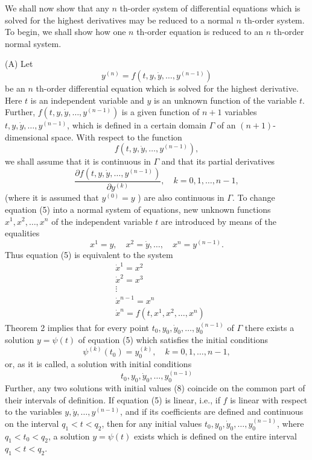 \documentclass[10pt,a5paper]{book}
\theoremstyle{plain}
\theoremstyle{definition}
\theoremstyle{remark}
\begin{document}
We shall now show that any $n$ th-order system of differential equations which is solved for the highest derivatives may be reduced to a normal $n$ th-order system. To begin, we shall show how one $n$ th-order equation is reduced to an $n$ th-order normal system.

(A) Let
\begin{equation*}
y^{(n)}=f\left(t, y, \dot{y}, \ldots, y^{(n-1)}\right) \tag{5}
\end{equation*}
be an $n$ th-order differential equation which is solved for the highest derivative. Here $t$ is an independent variable and $y$ is an unknown function of the variable $t$. Further, $f\left(t, y, \dot{y}, \ldots, y^{(n-1)}\right)$ is a given function of $n+1$ variables $t, y, \dot{y}, \ldots, y^{(n-1)}$, which is defined in a certain domain $\Gamma$ of an $(n+1)$-dimensional space. With respect to the function
\[
f\left(t, y, \dot{y}, \ldots, y^{(n-1)}\right),
\]
we shall assume that it is continuous in $\Gamma$ and that its partial derivatives
\[
\frac{\partial f\left(t, y, \dot{y}, \ldots, y^{(n-1)}\right)}{\partial y^{(k)}}, \quad k=0,1, \ldots, n-1,
\]
(where it is assumed that $y^{(0)}=y$ ) are also continuous in $\Gamma$. To change equation (5) into a normal system of equations, new unknown functions
$x^{1}, x^{2}, \ldots, x^{n}$ of the independent variable $t$ are introduced by means of the equalities
\begin{equation*}
x^{1}=y, \quad x^{2}=\dot{y}, \ldots, \quad x^{n}=y^{(n-1)} . \tag{6}
\end{equation*}
Thus equation (5) is equivalent to the system
\begin{align*}
& \dot{x}^{1}=x^{2} \\
& \dot{x}^{2}=x^{3} \\
& \vdots  \tag{7}\\
& \dot{x}^{n-1}=x^{n} \\
& \dot{x}^{n}=f\left(t, x^{1}, x^{2}, \ldots, x^{n}\right)
\end{align*}
Theorem 2 implies that for every point $t_{0}, y_{0}, \dot{y}_{0}, \ldots, y_{0}^{(n-1)}$ of $\Gamma$ there exists a solution $y=\psi(t)$ of equation (5) which satisfies the initial conditions
\[
\psi^{(k)}\left(t_{0}\right)=y_{0}^{(k)}, \quad k=0,1, \ldots, n-1,
\]
or, as it is called, a solution with initial conditions
\begin{equation*}
t_{0}, y_{0}, \dot{y}_{0}, \ldots, y_{0}^{(n-1)} \tag{8}
\end{equation*}
Further, any two solutions with initial values (8) coincide on the common part of their intervals of definition. If equation (5) is linear, i.e., if $f$ is linear with respect to the variables $y, \dot{y}, \ldots, y^{(n-1)}$, and if its coefficients are defined and continuous on the interval $q_{1}<t<q_{2}$, then for any initial values $t_{0}, y_{0}, \dot{y}_{0}, \ldots, y_{0}^{(n-1)}$, where $q_{1}<t_{0}<q_{2}$, a solution $y=\psi(t)$ exists which is defined on the entire interval $q_{1}<t<q_{2}$.
\end{document}
